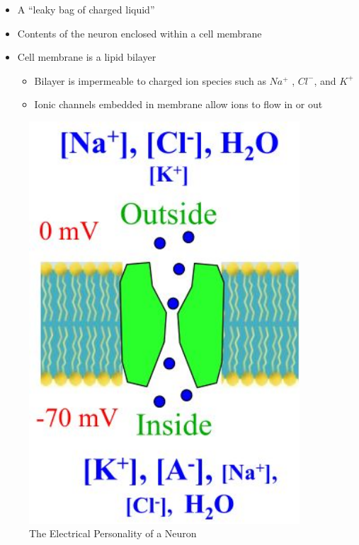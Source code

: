 \documentclass[]{article}
\begin{document}
\begin{itemize}
	\item  A ``leaky bag of charged liquid''
	\item Contents of the neuron enclosed within a cell membrane
	\item Cell membrane is a lipid bilayer
	\begin{itemize}
		\item Bilayer is impermeable to charged ion species such as $Na^+$ , $Cl^-$, and $K^+$
		\item Ionic channels embedded in 	membrane allow ions to flow in or out
	\end{itemize}
\end{itemize}

\begin{figure}[H]
	\caption[The Electrical Personality of a Neuron]{The Electrical Personality of a Neuron}
	\includegraphics[width=0.9\textwidth]{what-is-a-neuron2}
\end{figure}
\end{document}
